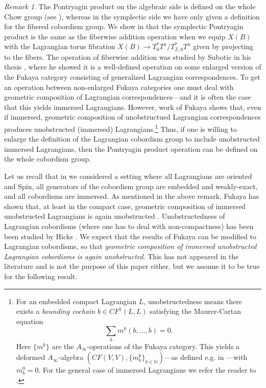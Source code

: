 \documentclass[10pt]{amsart}
\theoremstyle{definition}
\theoremstyle{remark}
\newtheorem{remark}[thm]{Remark}
\def\N{\mathbb{N}}
\def\Z{\mathbb{Z}}
\begin{document}
\begin{remark}
    The Pontryagin product on the algebraic side is defined on the whole Chow group (see ), whereas in the symplectic side we have only given a definition for the fibered cobordism group.
    We show in   that the symplectic Pontryagin product is the same as the fiberwise addition operation when we equip $X(B)$ with the Lagrangian torus fibration $X(B) \to T_0^*T^n/T_{\Z,0}^*T^n$ given by projecting to the fibers.
    The operation of fiberwise addition was studied by Subotic in his thesis \cite{subotic}, where he showed it is a well-defined operation on some enlarged version of the Fukaya category consisting of generalized Lagrangian correspondences.
    To get an operation between non-enlarged Fukaya categories one must deal with geometric composition of Lagrangian correspondences---and it is often the case that this yields immersed Lagrangians.
    However, work of Fukaya \cite{fukaya2017unobstructed} shows that, even if immersed, geometric composition of unobstructued Lagrangian correspondences produces unobstructed (immersed) Lagrangians.\footnote{For an embedded compact Lagrangian $L$, unobstructedness means there exists a \emph{bounding cochain} $b \in CF^1(L,L)$ satisfying the Maurer-Cartan equation 
    $$
    \sum_k m^k(b,\dots,b) = 0.
    $$
    Here $\{m^k\}$ are the $A_\infty$-operations of the Fukaya category. 
    This yields a deformed $A_\infty$-algebra $(CF(V,V),\{m^k_b\}_{k\in\N})$---as defined e.g. in \cite{fukaya2009lagrangian}---with $m_b^0 = 0$.
    For the general case of immersed Lagrangians we refer the reader to \cite{akaho2010immersed}.}
    Thus, if one is willing to enlarge the definition of the Lagrangian cobordism group to include unobstructed immersed Lagrangians, then the Pontryagin product operation can be defined on the whole cobordism group.
\end{remark}

Let us recall that in  we considered a setting where all Lagrangians are oriented and Spin, all generators of the cobordism group are embedded and weakly-exact, and all cobordisms are immersed.
As mentioned in the above remark, Fukaya has shown that, at least in the compact case, geometric composition of immersed unobstructed Lagrangians is again unobstructed \cite{fukaya2017unobstructed}.
Unobstructedness of  Lagrangian cobordisms (where one has to deal with non-compactness) has been been studied by Hicks \cite{hicks2019wall}.
We expect that the results of Fukaya can be modified to Lagrangian cobordisms, so that \emph{geometric composition of immersed unobstructed Lagrangian cobordisms is again unobstructed}.
This has not appeared in the literature and is not the purpose of this paper either, but we assume it to be true for the following result.
\end{document}
